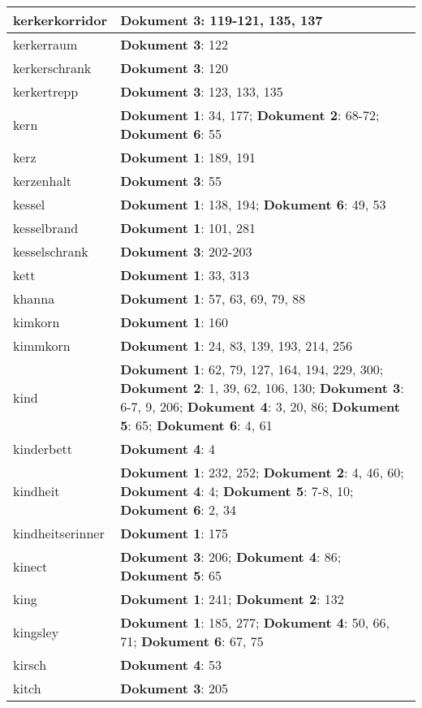 \documentclass[a5paper]{article}
\begin{document}
\begin{longtable}[l]{|l|p{3in}|}
\hline
kerkerkorridor & \textbf{Dokument 3}: 119-121, 135, 137 \\
\hline
kerkerraum & \textbf{Dokument 3}: 122 \\
\hline
kerkerschrank & \textbf{Dokument 3}: 120 \\
\hline
kerkertrepp & \textbf{Dokument 3}: 123, 133, 135 \\
\hline
kern & \textbf{Dokument 1}: 34, 177; \textbf{Dokument 2}: 68-72; \textbf{Dokument 6}: 55 \\
\hline
kerz & \textbf{Dokument 1}: 189, 191 \\
\hline
kerzenhalt & \textbf{Dokument 3}: 55 \\
\hline
kessel & \textbf{Dokument 1}: 138, 194; \textbf{Dokument 6}: 49, 53 \\
\hline
kesselbrand & \textbf{Dokument 1}: 101, 281 \\
\hline
kesselschrank & \textbf{Dokument 3}: 202-203 \\
\hline
kett & \textbf{Dokument 1}: 33, 313 \\
\hline
khanna & \textbf{Dokument 1}: 57, 63, 69, 79, 88 \\
\hline
kimkorn & \textbf{Dokument 1}: 160 \\
\hline
kimmkorn & \textbf{Dokument 1}: 24, 83, 139, 193, 214, 256 \\
\hline
kind & \textbf{Dokument 1}: 62, 79, 127, 164, 194, 229, 300; \textbf{Dokument 2}: 1, 39, 62, 106, 130; \textbf{Dokument 3}: 6-7, 9, 206; \textbf{Dokument 4}: 3, 20, 86; \textbf{Dokument 5}: 65; \textbf{Dokument 6}: 4, 61 \\
\hline
kinderbett & \textbf{Dokument 4}: 4 \\
\hline
kindheit & \textbf{Dokument 1}: 232, 252; \textbf{Dokument 2}: 4, 46, 60; \textbf{Dokument 4}: 4; \textbf{Dokument 5}: 7-8, 10; \textbf{Dokument 6}: 2, 34 \\
\hline
kindheitserinner & \textbf{Dokument 1}: 175 \\
\hline
kinect & \textbf{Dokument 3}: 206; \textbf{Dokument 4}: 86; \textbf{Dokument 5}: 65 \\
\hline
king & \textbf{Dokument 1}: 241; \textbf{Dokument 2}: 132 \\
\hline
kingsley & \textbf{Dokument 1}: 185, 277; \textbf{Dokument 4}: 50, 66, 71; \textbf{Dokument 6}: 67, 75 \\
\hline
kirsch & \textbf{Dokument 4}: 53 \\
\hline
kitch & \textbf{Dokument 3}: 205 \\

\end{longtable}
\end{document}
